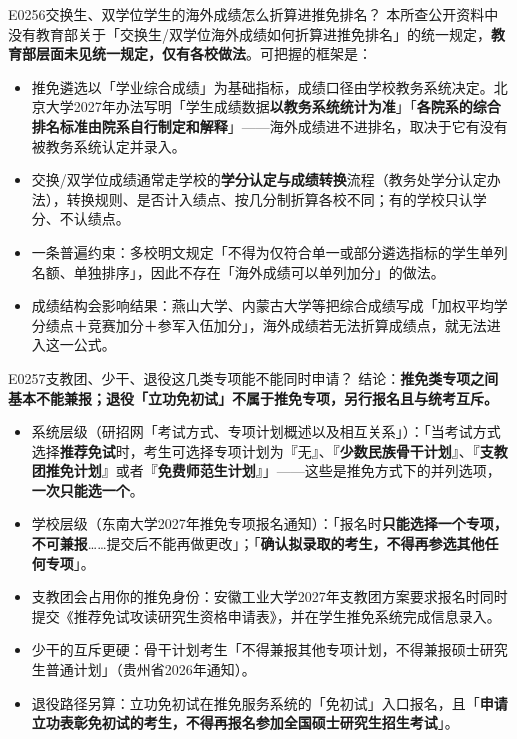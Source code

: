 \begin{qa}{E0256}{交换生、双学位学生的海外成绩怎么折算进推免排名？}
本所查公开资料中没有教育部关于「交换生/双学位海外成绩如何折算进推免排名」的统一规定，\textbf{教育部层面未见统一规定，仅有各校做法}。可把握的框架是：
\begin{itemize}
  \item 推免遴选以「学业综合成绩」为基础指标，成绩口径由学校教务系统决定。北京大学2027年办法写明「学生成绩数据\textbf{以教务系统统计为准}」「\textbf{各院系的综合排名标准由院系自行制定和解释}」——海外成绩进不进排名，取决于它有没有被教务系统认定并录入。
  \item 交换/双学位成绩通常走学校的\textbf{学分认定与成绩转换}流程（教务处学分认定办法），转换规则、是否计入绩点、按几分制折算各校不同；有的学校只认学分、不认绩点。
  \item 一条普遍约束：多校明文规定「不得为仅符合单一或部分遴选指标的学生单列名额、单独排序」，因此不存在「海外成绩可以单列加分」的做法。
  \item 成绩结构会影响结果：燕山大学、内蒙古大学等把综合成绩写成「加权平均学分绩点＋竞赛加分＋参军入伍加分」，海外成绩若无法折算成绩点，就无法进入这一公式。
\end{itemize}
\end{qa}

\begin{qa}{E0257}{支教团、少干、退役这几类专项能不能同时申请？}
结论：\textbf{推免类专项之间基本不能兼报；退役「立功免初试」不属于推免专项，另行报名且与统考互斥。}
\begin{itemize}
  \item 系统层级（研招网「考试方式、专项计划概述以及相互关系」）：「当考试方式选择\textbf{推荐免试}时，考生可选择专项计划为『无』、『\textbf{少数民族骨干计划}』、『\textbf{支教团推免计划}』或者『\textbf{免费师范生计划}』」——这些是推免方式下的并列选项，\textbf{一次只能选一个}。
  \item 学校层级（东南大学2027年推免专项报名通知）：「报名时\textbf{只能选择一个专项，不可兼报}……提交后不能再做更改」；「\textbf{确认拟录取的考生，不得再参选其他任何专项}」。
  \item 支教团会占用你的推免身份：安徽工业大学2027年支教团方案要求报名时同时提交《推荐免试攻读研究生资格申请表》，并在学生推免系统完成信息录入。
  \item 少干的互斥更硬：骨干计划考生「不得兼报其他专项计划，不得兼报硕士研究生普通计划」（贵州省2026年通知）。
  \item 退役路径另算：立功免初试在推免服务系统的「免初试」入口报名，且「\textbf{申请立功表彰免初试的考生，不得再报名参加全国硕士研究生招生考试}」。
\end{itemize}
\end{qa}

